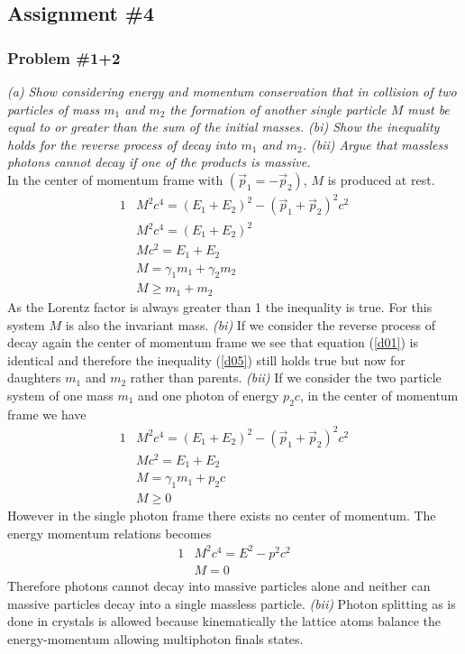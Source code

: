 \documentclass[]{article}
\numberwithin{equation}{subsection}
\begin{document}
\subsection{Assignment \#4}
\subsubsection*{Problem \#1+2}
\emph{(a) Show considering energy and momentum conservation that in collision of two particles of mass $m_{1}$ and $m_{2}$ the formation of another single particle $M$ must be equal to or greater than the sum of the initial masses. (bi) Show the inequality holds for the reverse process of decay into $m_{1}$ and $m_{2}$. (bii) Argue that massless photons cannot decay if one of the products is massive.}\\

\noindent In the center of momentum frame with $(\vec{p}_{1}=-\vec{p}_{2})$, $M$ is produced at rest.
\begin{alignat}{1}
	\label{d01}	&M^{2}c^{4}=(E_{1}+E_{2})^{2}-(\vec{p}_{1}+\vec{p}_{2})^{2}c^{2}\\
	\label{d02}	&M^{2}c^{4}=(E_{1}+E_{2})^{2}\\
	\label{d03}	&Mc^{2}=E_{1}+E_{2}\\
	\label{d04}	&M=\gamma_{1}m_{1}+\gamma_{2}m_{2}\\
	\label{d05}	&M\geq m_{1}+m_{2}
\end{alignat}
As the Lorentz factor is always greater than 1 the inequality is true. For this system $M$ is also the invariant mass. \emph{(bi)} If we consider the reverse process of decay again the center of momentum frame we see that equation (\ref{d01}) is identical and therefore the inequality (\ref{d05}) still holds true but now for daughters $m_{1}$ and $m_{2}$ rather than parents. \emph{(bii)} If we consider the two particle system of one mass $m_{1}$ and one photon of energy $p_{2}c$, in the center of momentum frame we have
\begin{alignat}{1}
	\label{d06}	&M^{2}c^{4}=(E_{1}+E_{2})^{2}-(\vec{p}_{1}+\vec{p}_{2})^{2}c^{2}\\
	\label{d07}	&Mc^{2}=E_{1}+E_{2}\\
	\label{d08}	&M=\gamma_{1}m_{1}+p_{2}c\\
	\label{d09}	&M\geq 0
\end{alignat}
However in the single photon frame there exists no center of momentum. The energy momentum relations becomes
\begin{alignat}{1}
	\label{d10}	&M^{2}c^{4}=E^{2}-p^{2}c^{2}\\
	\label{d11}	&M=0
\end{alignat}
Therefore photons cannot decay into massive particles alone and neither can massive particles decay into a single massless particle. \emph{(bii)} Photon splitting as is done in crystals is allowed because kinematically the lattice atoms balance the energy-momentum allowing multiphoton finals states.
\end{document}
